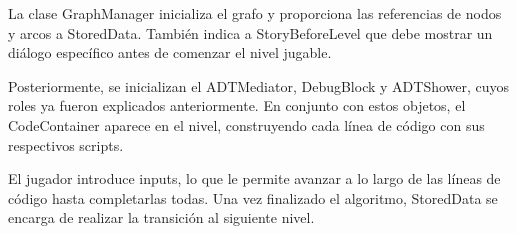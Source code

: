 La clase GraphManager inicializa el grafo y proporciona las referencias de nodos y arcos a StoredData. También indica a StoryBeforeLevel que debe mostrar un diálogo específico antes de comenzar el nivel jugable.

Posteriormente, se inicializan el ADTMediator, DebugBlock y ADTShower, cuyos roles ya fueron explicados anteriormente. En conjunto con estos objetos, el CodeContainer aparece en el nivel, construyendo cada línea de código con sus respectivos scripts.

El jugador introduce inputs, lo que le permite avanzar a lo largo de las líneas de código hasta completarlas todas. Una vez finalizado el algoritmo, StoredData se encarga de realizar la transición al siguiente nivel.






